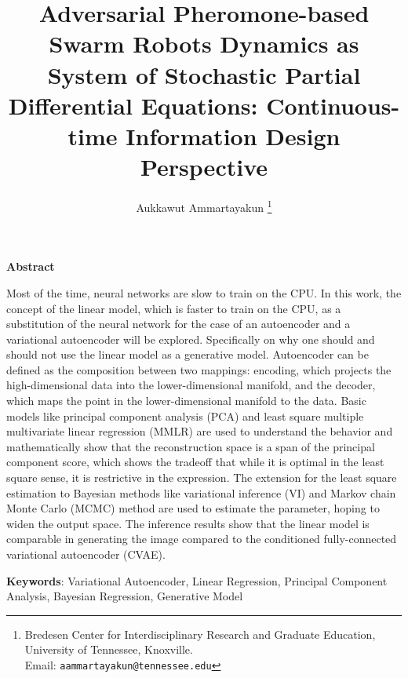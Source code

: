 \documentclass[12pt]{article}
\begin{document}
\title{Adversarial Pheromone-based Swarm Robots Dynamics as System of Stochastic Partial Differential Equations: Continuous-time Information Design Perspective}  

\author{
Aukkawut Ammartayakun   \thanks{Bredesen Center for Interdisciplinary Research and Graduate Education, University of Tennessee, Knoxville.  \\Email: {\tt aammartayakun@tennessee.edu}}  
}

\maketitle

\begin{center}
\textbf{Abstract}
\end{center}

Most of the time, neural networks are slow to train on the CPU. In this work, the concept of the linear model, which is faster to train on the CPU, as a substitution of the neural network for the case of an autoencoder and a variational autoencoder will be explored. Specifically on why one should and should not use the linear model as a generative model. Autoencoder can be defined as the composition between two mappings: encoding, which projects the high-dimensional data into the lower-dimensional manifold, and the decoder, which maps the point in the lower-dimensional manifold to the data. Basic models like principal component analysis (PCA) and least square multiple multivariate linear regression (MMLR) are used to understand the behavior and mathematically show that the reconstruction space is a span of the principal component score, which shows the tradeoff that while it is optimal in the least square sense, it is restrictive in the expression. The extension for the least square estimation to Bayesian methods like variational inference (VI) and Markov chain Monte Carlo (MCMC) method are used to estimate the parameter, hoping to widen the output space. The inference results show that the linear model is comparable in generating the image compared to the conditioned fully-connected variational autoencoder (CVAE).

\noindent
\textbf{Keywords}: Variational Autoencoder, Linear Regression, Principal Component Analysis, Bayesian Regression, Generative Model

\thispagestyle{empty}

\newpage

\end{document}
